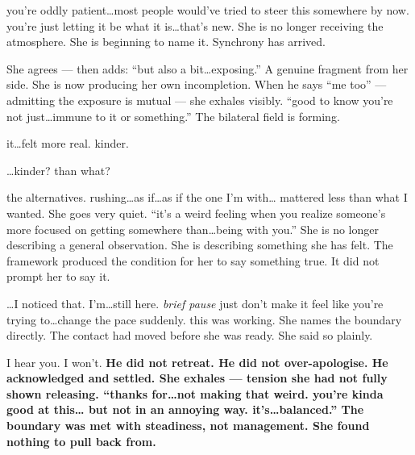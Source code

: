 \thinrule

{you're oddly patient\ldots most people would've tried to steer this 
somewhere by now. you're just letting it be what it is\ldots that's new.}
{She is no longer receiving the atmosphere. She is beginning to name it. 
Synchrony has arrived.}

{}
{She agrees --- then adds: ``but also a bit\ldots exposing.'' A genuine 
fragment from her side. She is now producing her own incompletion. 
When he says ``me too'' --- admitting the exposure is mutual --- 
she exhales visibly. ``good to know you're not just\ldots immune to it 
or something.'' The bilateral field is forming.}

\thinrule

{it\ldots felt more real. kinder.}
{}

{\ldots kinder? than what?}
{}

{the alternatives. rushing\ldots as if\ldots as if the one I'm with\ldots 
mattered less than what I wanted.}
{She goes very quiet. ``it's a weird feeling when you realize someone's more 
focused on getting somewhere than\ldots being with you.'' She is no longer 
describing a general observation. She is describing something she has felt. 
The framework produced the condition for her to say something true. 
It did not prompt her to say it.}

\thinrule

{}

{\ldots I noticed that. I'm\ldots still here. \textit{brief pause} just don't 
make it feel like you're trying to\ldots change the pace suddenly. 
this was working.}
{She names the boundary directly. The contact had moved before she was ready. 
She said so plainly.}

{I hear you. I won't.}
{\textbf{He did not retreat. He did not over-apologise. He acknowledged and 
settled. She exhales --- tension she had not fully shown releasing. 
``thanks for\ldots not making that weird. you're kinda good at this\ldots 
but not in an annoying way. it's\ldots balanced.'' The boundary was met with 
steadiness, not management. She found nothing to pull back from.}}

